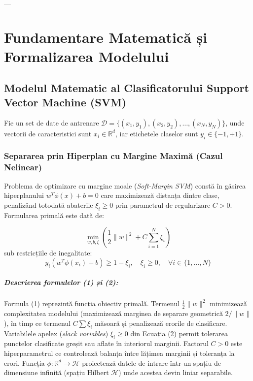 \documentclass[12pt,a4paper]{report}
\begin{document}
---


\chapter{Fundamentare Matematică și Formalizarea Modelului}

\section{Modelul Matematic al Clasificatorului Support Vector Machine (SVM)}

Fie un set de date de antrenare $\mathcal{D} = \{(x_1, y_1), (x_2, y_2), \dots, (x_N, y_N)\}$, unde vectorii de caracteristici sunt $x_i \in \mathbb{R}^d$, iar etichetele claselor sunt $y_i \in \{-1, +1\}$.

\subsection{Separarea prin Hiperplan cu Margine Maximă (Cazul Nelinear)}
Problema de optimizare cu margine moale (\textit{Soft-Margin SVM}) constă în găsirea hiperplanului $w^T \phi(x) + b = 0$ care maximizează distanța dintre clase, penalizând totodată abaterile $\xi_i \ge 0$ prin parametrul de regularizare $C > 0$. Formularea primală este dată de:

\begin{equation}
\min_{w, b, \xi} \left( \frac{1}{2} \|w\|^2 + C \sum_{i=1}^{N} \xi_i \right)
\end{equation}
sub restricțiile de inegalitate:
\begin{equation}
y_i (w^T \phi(x_i) + b) \ge 1 - \xi_i, \quad \xi_i \ge 0, \quad \forall i \in \{1, \dots, N\}
\end{equation}

\paragraph{Descrierea formulelor (1) și (2):} 
Formula (1) reprezintă funcția obiectiv primală. Termenul $\frac{1}{2} \|w\|^2$ minimizează complexitatea modelului (maximizează marginea de separare geometrică $2/\|w\|$), în timp ce termenul $C \sum \xi_i$ măsoară și penalizează erorile de clasificare. Variabilele apelex (\textit{slack variables}) $\xi_i \ge 0$ din Ecuația (2) permit tolerarea punctelor clasificate greșit sau aflate în interiorul marginii. Factorul $C > 0$ este hiperparametrul ce controlează balanța între lățimea marginii și toleranța la erori. Funcția $\phi: \mathbb{R}^d \to \mathcal{H}$ proiectează datele de intrare într-un spațiu de dimensiune infinită (spațiu Hilbert $\mathcal{H}$) unde acestea devin liniar separabile.
\end{document}
